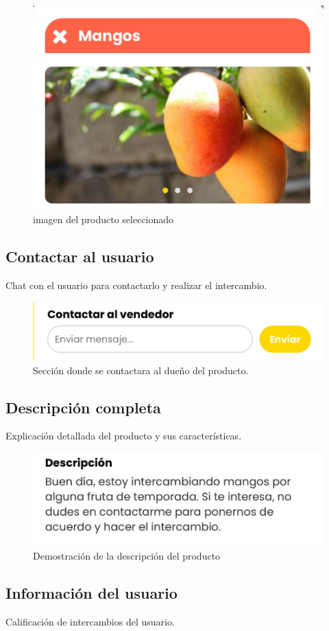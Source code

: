 \documentclass[11pt, a4paper, oneside]{book}
\begin{document}
\begin{figure}[H]
    \centering
    \includegraphics[width=0.5
    \linewidth]{Pictures/ImagenProducto.png  }
            \caption{imagen del producto seleccionado}
\end{figure}

\subsection{Contactar al usuario}
Chat con el usuario para contactarlo y realizar el intercambio.

\begin{figure}[H]
    \centering
    \includegraphics[width=0.75
    \linewidth]{Pictures/ContactarUsuario.png  }
            \caption{Sección donde se contactara al dueño del producto.}
\end{figure}

\subsection{Descripción completa}
Explicación detallada del producto y sus características.

\begin{figure}[H]
    \centering
    \includegraphics[width=0.60
    \linewidth]{Pictures/DescripcionProducto.png  }
            \caption{Demostración de la descripción del producto}
\end{figure}

\subsection{Información del usuario}
Calificación de intercambios del usuario.
\end{document}
